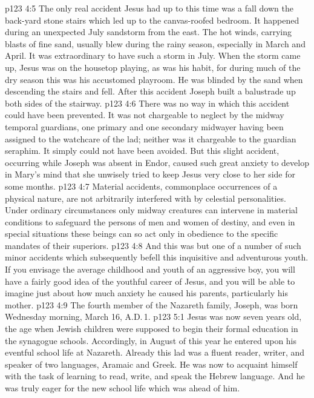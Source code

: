 \vs p123 4:5 \pc The only real accident Jesus had up to this time was a fall down the back\hyp{}yard stone stairs which led up to the canvas\hyp{}roofed bedroom. It happened during an unexpected July sandstorm from the east. The hot winds, carrying blasts of fine sand, usually blew during the rainy season, especially in March and April. It was extraordinary to have such a storm in July. When the storm came up, Jesus was on the housetop playing, as was his habit, for during much of the dry season this was his accustomed playroom. He was blinded by the sand when descending the stairs and fell. After this accident Joseph built a balustrade up both sides of the stairway.
\vs p123 4:6 There was no way in which this accident could have been prevented. It was not chargeable to neglect by the midway temporal guardians, one primary and one secondary midwayer having been assigned to the watchcare of the lad; neither was it chargeable to the guardian seraphim. It simply could not have been avoided. But this slight accident, occurring while Joseph was absent in Endor, caused such great anxiety to develop in Mary’s mind that she unwisely tried to keep Jesus very close to her side for some months.
\vs p123 4:7 Material accidents, commonplace occurrences of a physical nature, are not arbitrarily interfered with by celestial personalities. Under ordinary circumstances only midway creatures can intervene in material conditions to safeguard the persons of men and women of destiny, and even in special situations these beings can so act only in obedience to the specific mandates of their superiors.
\vs p123 4:8 And this was but one of a number of such minor accidents which subsequently befell this inquisitive and adventurous youth. If you envisage the average childhood and youth of an aggressive boy, you will have a fairly good idea of the youthful career of Jesus, and you will be able to imagine just about how much anxiety he caused his parents, particularly his mother.
\vs p123 4:9 \pc The fourth member of the Nazareth family, Joseph, was born Wednesday morning, March 16, A.D.\,1.
\vs p123 5:1 Jesus was now seven years old, the age when Jewish children were supposed to begin their formal education in the synagogue schools. Accordingly, in August of this year he entered upon his eventful school life at Nazareth. Already this lad was a fluent reader, writer, and speaker of two languages, Aramaic and Greek. He was now to acquaint himself with the task of learning to read, write, and speak the Hebrew language. And he was truly eager for the new school life which was ahead of him.

